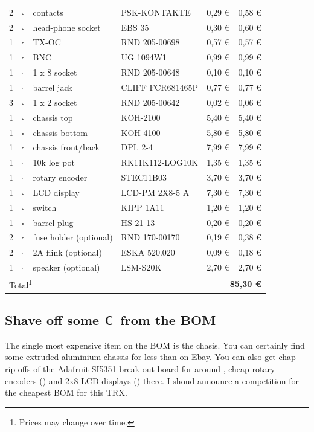 \documentclass[10pt, a4paper,twoside,openright]{scrartcl}
\begin{document}
\begin{longtable}{|p{}|p{}|p{}|p{}|p{}|p{}|}
2 & $\square$ & contacts & PSK-KONTAKTE & 0,29 \euro & 0,58 \euro \\
2 & $\square$ & head-phone socket & EBS 35 & 0,30 \euro & 0,60 \euro\\
1 & $\square$ & TX-OC & RND 205-00698 & 0,57 \euro & 0,57 \euro \\
1 & $\square$ & BNC & UG 1094W1 & 0,99 \euro & 0,99 \euro \\
1 & $\square$ & 1 x 8 socket & RND 205-00648 & 0,10 \euro & 0,10 \euro \\
1 & $\square$ & barrel jack & CLIFF FCR681465P & 0,77 \euro & 0,77 \euro \\
3 & $\square$ & 1 x 2 socket & RND 205-00642 & 0,02 \euro & 0,06 \euro \\ \hline
1 & $\square$ & chassis top & KOH-2100 & 5,40 \euro & 5,40 \euro \\
1 & $\square$ & chassis bottom & KOH-4100 & 5,80 \euro & 5,80 \euro \\
1 & $\square$ & chassis front/back & DPL 2-4 & 7,99 \euro & 7,99 \euro \\
1 & $\square$ & 10k log pot & RK11K112-LOG10K & 1,35 \euro & 1,35 \euro \\
1 & $\square$ & rotary encoder & STEC11B03 & 3,70 \euro & 3,70 \euro \\
1 & $\square$ & LCD display & LCD-PM 2X8-5 A & 7,30 \euro & 7,30 \euro \\
1 & $\square$ & switch & KIPP 1A11 & 1,20 \euro & 1,20 \euro \\
1 & $\square$ & barrel plug & HS 21-13 & 0,20 \euro & 0,20 \euro \\
2 & $\square$ & fuse holder (optional) & RND 170-00170 & 0,19 \euro & 0,38 \euro \\
2 & $\square$ & 2A flink (optional) & ESKA 520.020 & 0,09 \euro & 0,18 \euro \\
1 & $\square$ & speaker (optional) & LSM-S20K & 2,70 \euro & 2,70 \euro \\ \hline \hline
\multicolumn{4}{|l}{Total\footnote{Prices may change over time.}} & \multicolumn{2}{r|}{\textbf{85,30 \euro}} \\ \hline
\end{longtable}

\subsection{Shave off some \euro\ from the BOM}
The single most expensive item on the BOM is the chasis. You can certainly find some extruded aluminium chassis for less than  on Ebay. You can also get chap rip-offs of the Adafruit SI5351 break-out board for around , cheap rotary encoders () and 2x8 LCD displays () there. I shoud announce a competition for the cheapest BOM for this TRX.
\end{document}
